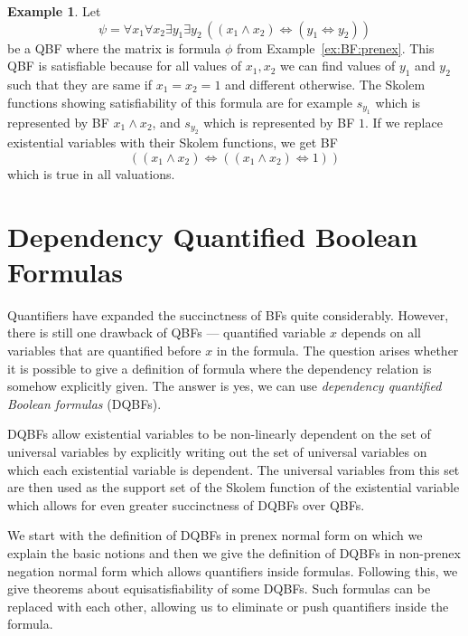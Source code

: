 \documentclass[
  digital, %
  color,
  twoside, %
  table,   %
  nolof,     %
  nolot,     %
]{fithesis3}
\theoremstyle{definition}
\newtheorem{example}{Example}
\theoremstyle{remark}
\newcommand{\lequal}{\Leftrightarrow}
\newcommand{\itholds}{\,}
\begin{document}
\begin{example}
\label{ex:QBF:prenex}
Let 
\[\psi = \forall x_1 \forall x_2 \exists y_1  \exists y_2 \itholds ((x_1 \land x_2) \lequal (y_1 \lequal y_2))\]
be a QBF where the matrix is formula $\phi$ from Example~\ref{ex:BF:prenex}. This QBF is satisfiable because for all values of $x_1, x_2$ we can find values of $y_1$ and $y_2$ such that they are same if $x_1 = x_2 = 1$ and different otherwise. The Skolem functions showing satisfiability of this formula are for example $s_{y_1}$ which is represented by BF $x_1 \land x_2$, and $s_{y_2}$ which is represented by BF $1$. If we replace existential variables with their Skolem functions, we get BF
\[((x_1 \land x_2) \lequal ((x_1 \land x_2) \lequal 1))\]
which is true in all valuations.
\end{example}

\section{Dependency Quantified Boolean Formulas}
Quantifiers have expanded the succinctness of BFs quite considerably. However, there is still one drawback of QBFs --- quantified variable $x$ depends on all variables that are quantified before $x$ in the formula. The question arises whether it is possible to give a definition of formula where the dependency relation is somehow explicitly given. The answer is yes, we can use \emph{dependency quantified Boolean formulas} (DQBFs).

DQBFs allow existential variables to be non-linearly dependent on the set of universal variables by explicitly writing out the set of universal variables on which each existential variable is dependent. The universal variables from this set are then used as the support set of the Skolem function of the existential variable which allows for even greater succinctness of DQBFs over QBFs.  

We start with the definition of DQBFs in prenex normal form on which we explain the basic notions and then we give the definition of DQBFs in non-prenex negation normal form which allows quantifiers inside formulas. Following this, we give theorems about equisatisfiability of some DQBFs. Such formulas can be replaced with each other, allowing us to eliminate or push quantifiers inside the formula.
\end{document}
